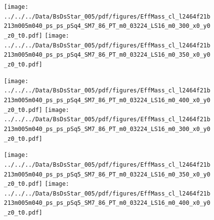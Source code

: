 \documentclass[a4paper,10pt]{article}
\begin{document}
\clearpage
\begin{figure}[p]
 \texttt{[image: ../../../Data/BsDsStar\_005/pdf/figures/EffMass\_cl\_l2464f21b213m005m040\_ps\_ps\_pSq4\_SM7\_86\_PT\_m0\_03224\_LS16\_m0\_300\_x0\_y0\_z0\_t0.pdf]} 
 \texttt{[image: ../../../Data/BsDsStar\_005/pdf/figures/EffMass\_cl\_l2464f21b213m005m040\_ps\_ps\_pSq4\_SM7\_86\_PT\_m0\_03224\_LS16\_m0\_350\_x0\_y0\_z0\_t0.pdf]} 
 \end{figure}
\begin{figure}[p]
 \texttt{[image: ../../../Data/BsDsStar\_005/pdf/figures/EffMass\_cl\_l2464f21b213m005m040\_ps\_ps\_pSq4\_SM7\_86\_PT\_m0\_03224\_LS16\_m0\_400\_x0\_y0\_z0\_t0.pdf]} 
 \texttt{[image: ../../../Data/BsDsStar\_005/pdf/figures/EffMass\_cl\_l2464f21b213m005m040\_ps\_ps\_pSq5\_SM7\_86\_PT\_m0\_03224\_LS16\_m0\_300\_x0\_y0\_z0\_t0.pdf]} 
 \end{figure}
\begin{figure}[p]
 \texttt{[image: ../../../Data/BsDsStar\_005/pdf/figures/EffMass\_cl\_l2464f21b213m005m040\_ps\_ps\_pSq5\_SM7\_86\_PT\_m0\_03224\_LS16\_m0\_350\_x0\_y0\_z0\_t0.pdf]} 
 \texttt{[image: ../../../Data/BsDsStar\_005/pdf/figures/EffMass\_cl\_l2464f21b213m005m040\_ps\_ps\_pSq5\_SM7\_86\_PT\_m0\_03224\_LS16\_m0\_400\_x0\_y0\_z0\_t0.pdf]} 
 \end{figure}
\clearpage
\clearpage
\end{document}
